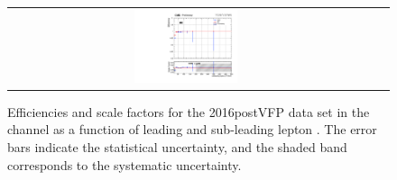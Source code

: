 \begin{figure}[!htb]
\begin{center}
\begin{tabular}{ccc}
      \includegraphics[width=0.30\textwidth]{fig_2016postVFP_TrigSF/g_ee_lepBpt_FullSystUncBand.pdf}\\
    \end{tabular}
    \caption{Efficiencies and scale factors for the 2016postVFP data set in the \ee channel as a function of leading and sub-leading lepton \pT.
            The error bars indicate the statistical uncertainty, and the shaded band corresponds to the systematic uncertainty.
            }
    \label{TrigSF_2016postVFP_2}
  \end{center}
\end{figure}

